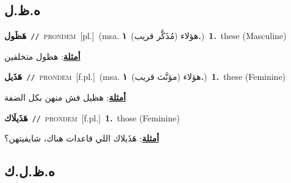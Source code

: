 \documentclass[10pt,a4paper,twoside]{article} %
\begin{document}
\begin{multicols}{2}
\vspace{-3mm}
\subsection*{\color{blue}\foreignlanguage{arabic}{ه.ظ.ل}\color{blue}{ (ntws)}} 

{\setlength\topsep{0pt}\textbf{\foreignlanguage{arabic}{هَظَول}}\ {\color{gray}\texttt{//}\color{black}}\ \textsc{pron\textunderscore dem}\ [pl.]\ \color{gray}(msa. \foreignlanguage{arabic}{هؤلاء (مُذَكَّر قريب)}~\foreignlanguage{arabic}{\textbf{١.}})\color{black}\ \textbf{1.}~these (Masculine)\  \begin{flushright}\color{gray}\foreignlanguage{arabic}{\textbf{\underline{\foreignlanguage{arabic}{أمثلة}}}: هظول متخلفين}\end{flushright}\color{black}} \vspace{2mm}

{\setlength\topsep{0pt}\textbf{\foreignlanguage{arabic}{هَذَيل}}\ {\color{gray}\texttt{//}\color{black}}\ \textsc{pron\textunderscore dem}\ [f.pl.]\ \color{gray}(msa. \foreignlanguage{arabic}{هؤلاء (مؤنَّث قريب)}~\foreignlanguage{arabic}{\textbf{١.}})\color{black}\ \textbf{1.}~these (Feminine)\  \begin{flushright}\color{gray}\foreignlanguage{arabic}{\textbf{\underline{\foreignlanguage{arabic}{أمثلة}}}: هظيل فش منهن بكل الضفة}\end{flushright}\color{black}} \vspace{2mm}

{\setlength\topsep{0pt}\textbf{\foreignlanguage{arabic}{هَذَيلَاك}}\ {\color{gray}\texttt{//}\color{black}}\ \textsc{pron\textunderscore dem}\ [f.pl.]\ \textbf{1.}~those (Feminine)\  \begin{flushright}\color{gray}\foreignlanguage{arabic}{\textbf{\underline{\foreignlanguage{arabic}{أمثلة}}}: هَذَيلاك اللي قاعدات هناك، شايفيتهن؟}\end{flushright}\color{black}} \vspace{2mm}

\vspace{-3mm}
\subsection*{\color{blue}\foreignlanguage{arabic}{ه.ظ.ل.ك}\color{blue}{ (ntws)}} 


\end{multicols}
\end{document}

